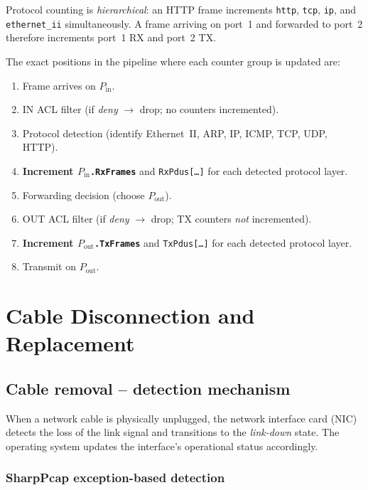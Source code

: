 \documentclass[12pt,a4paper]{article}
\begin{document}
Protocol counting is \emph{hierarchical}: an HTTP frame increments
\texttt{http}, \texttt{tcp}, \texttt{ip}, and \texttt{ethernet\_ii}
simultaneously.  A frame arriving on port~1 and forwarded to port~2 therefore
increments port~1 RX and port~2 TX.

The exact positions in the pipeline where each counter group is updated are:

\begin{enumerate}[noitemsep]
  \item Frame arrives on $P_{\mathrm{in}}$.
  \item IN ACL filter (if \emph{deny} $\to$ drop; no counters incremented).
  \item Protocol detection (identify Ethernet~II, ARP, IP, ICMP, TCP, UDP, HTTP).
  \item \textbf{Increment $P_{\mathrm{in}}$\texttt{.RxFrames}} and
        \texttt{RxPdus[\ldots]} for each detected protocol layer.
  \item Forwarding decision (choose $P_{\mathrm{out}}$).
  \item OUT ACL filter (if \emph{deny} $\to$ drop; TX counters
        \emph{not} incremented).
  \item \textbf{Increment $P_{\mathrm{out}}$\texttt{.TxFrames}} and
        \texttt{TxPdus[\ldots]} for each detected protocol layer.
  \item Transmit on $P_{\mathrm{out}}$.
\end{enumerate}

\section{Cable Disconnection and Replacement}
\label{sec:cable}

\subsection{Cable removal -- detection mechanism}

When a network cable is physically unplugged, the network interface card (NIC)
detects the loss of the link signal and transitions to the
\emph{link-down} state.  The operating system updates the interface's
operational status accordingly.

\subsubsection{SharpPcap exception-based detection}
\end{document}
